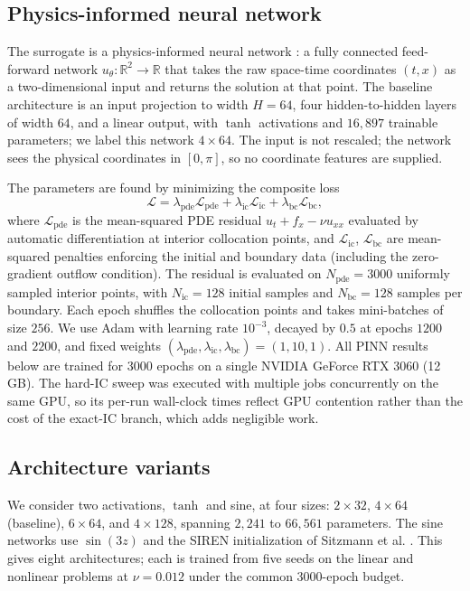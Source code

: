 \documentclass[11pt]{article}
\begin{document}
\subsection{Physics-informed neural network}
\label{sec:pinn}
The surrogate is a physics-informed neural network \citep{raissi2019}: a
fully connected feed-forward network $u_\theta:\mathbb{R}^2\to\mathbb{R}$ that
takes the raw space-time coordinates $(t,x)$ as a two-dimensional input and
returns the solution at that point. The baseline
architecture is an input projection to width $H=64$, four hidden-to-hidden
layers of width $64$, and a linear output, with $\tanh$ activations and
$16{,}897$ trainable parameters; we label this network $4\times64$. The input
is not rescaled; the network
sees the physical coordinates in $[0,\pi]$, so no coordinate features are
supplied.

The parameters are found by minimizing the composite loss
\begin{equation}
  \mathcal{L} = \lambda_{\text{pde}}\mathcal{L}_{\text{pde}}
  + \lambda_{\text{ic}}\mathcal{L}_{\text{ic}}
  + \lambda_{\text{bc}}\mathcal{L}_{\text{bc}},
  \label{eq:loss}
\end{equation}
where $\mathcal{L}_{\text{pde}}$ is the mean-squared PDE residual
$u_t + f_x - \nu u_{xx}$ evaluated by automatic differentiation at interior
collocation points, and $\mathcal{L}_{\text{ic}}$, $\mathcal{L}_{\text{bc}}$
are mean-squared penalties enforcing the initial and boundary data
(including the zero-gradient outflow condition). The residual is evaluated on
$N_{\text{pde}}=3000$ uniformly sampled interior points, with
$N_{\text{ic}}=128$ initial samples and $N_{\text{bc}}=128$ samples per
boundary.
Each epoch shuffles the collocation points and takes mini-batches of size
$256$. We use Adam with learning rate $10^{-3}$, decayed by $0.5$ at epochs
$1200$ and $2200$, and fixed weights
$(\lambda_{\text{pde}},\lambda_{\text{ic}},\lambda_{\text{bc}}) = (1,10,1)$.
All PINN results below are trained for 3000 epochs on a single NVIDIA
GeForce RTX 3060 (12\,GB). The hard-IC sweep was executed with multiple jobs
concurrently on the same GPU, so its per-run wall-clock times reflect GPU
contention rather than the cost of the exact-IC branch, which adds negligible
work.

\subsection{Architecture variants}
\label{sec:variants}
We consider two activations, $\tanh$ and sine, at four sizes:
$2\times32$, $4\times64$ (baseline), $6\times64$, and $4\times128$, spanning
$2{,}241$ to $66{,}561$ parameters. The sine networks use $\sin(3z)$ and the
SIREN initialization of Sitzmann et al. \citep{sitzmann2020}. This gives eight
architectures; each is trained from five seeds on the linear and nonlinear
problems at $\nu=0.012$ under the common 3000-epoch budget.
\end{document}
